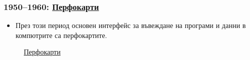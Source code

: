 \documentclass[ignorenonframetext, hyperref=unicode]{beamer}
\begin{document}
\begin{frame}
\frametitle{1950--1960: \href{http://en.wikipedia.org/wiki/Punch_card}{Перфокарти}}
\begin{itemize}
  \item През този период основен интерфейс за въвеждане на програми и данни в
  компютрите са перфокартите.
\end{itemize}
\begin{figure}[h]
\center
{}
\caption{\href{http://en.wikipedia.org/wiki/Punch_card}{Перфокарти}}
\end{figure}

\end{frame}
\end{document}
